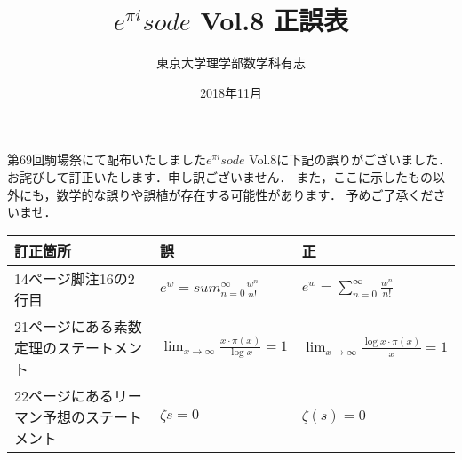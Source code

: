 \documentclass{jsarticle}
\title{$e^{\pi i}sode$ Vol.8 正誤表}
\date{2018年11月}
\author{東京大学理学部数学科有志}
\begin{document}
\maketitle

第69回駒場祭にて配布いたしました$e^{\pi i}sode$ Vol.8に下記の誤りがございました．
お詫びして訂正いたします．申し訳ございません．
また，ここに示したもの以外にも，数学的な誤りや誤植が存在する可能性があります．
予めご了承くださいませ．

\begin{table}[h]
\begin{center}
\begin{tabular}{lll}
訂正箇所&誤&正 \\\hline
14ページ脚注16の2行目&$e^w=sum^\infty_{n=0}\frac{w^n}{n!}$&$e^w=\sum^\infty_{n=0}\frac{w^n}{n!}$ \\
21ページにある素数定理のステートメント&$\displaystyle\lim_{x\to\infty}\frac{x\cdot\pi(x)}{\log x}=1$&$\displaystyle\lim_{x\to\infty}\frac{\log x\cdot\pi(x)}{x}=1$ \\
22ページにあるリーマン予想のステートメント&$\zeta{s}=0$&$\zeta(s)=0$
\end{tabular}
\end{center}
\end{table}
\end{document}

